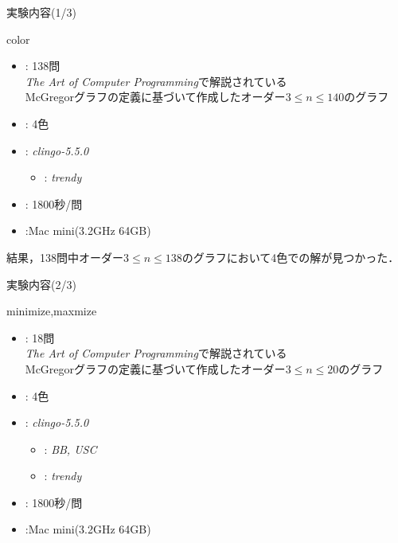 \documentclass[dvipdfmx,11pt]{beamer}
\begin{document}

\begin{frame}{実験内容(1/3)}
 \begin{block}{color}
  \begin{itemize}
   \item {}: 138問 \\
         \textit{The Art of Computer Programming}で解説されている \\
         McGregorグラフの定義に基づいて作成したオーダー$3 \leq n \leq 140$のグラフ
   \item {}: 4色
   \item {}: \textit{clingo-5.5.0}
         \begin{itemize}
          \item {}: \textit{trendy}
         \end{itemize}
   \item {}: 1800秒/問
   \item {}:Mac mini(3.2GHz 64GB)
  \end{itemize}
 \end{block}
 \begin{alertblock}{}
  結果，138問中オーダー$3 \leq n \leq 138$のグラフにおいて4色での解が見つかった．
 \end{alertblock}
\end{frame}


\begin{frame}{実験内容(2/3)}
 \begin{block}{minimize,maxmize}
  \begin{itemize}
   \item {}: 18問 \\
         \textit{The Art of Computer Programming}で解説されている \\
         McGregorグラフの定義に基づいて作成したオーダー$3 \leq n \leq 20$のグラフ
   \item {}: 4色
   \item {}: \textit{clingo-5.5.0}
         \begin{itemize}
          \item {}: \textit{BB, USC}
          \item {}: \textit{trendy}
         \end{itemize}
   \item {}: 1800秒/問
   \item {}:Mac mini(3.2GHz 64GB)
  \end{itemize}
 \end{block}
\end{frame}
\end{document}
